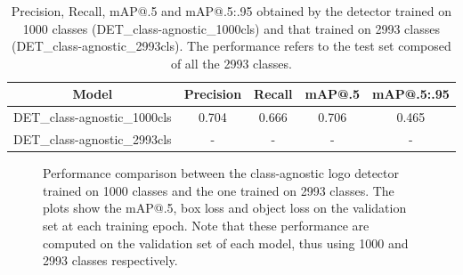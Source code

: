 \begin{table}[H]
    \centering
    \begin{tabular}{c|c|c|c|c}
        \hline
        \textbf{Model} &
        \textbf{Precision} &
        \textbf{Recall} &
        \textbf{mAP@.5} &
        \textbf{mAP@.5:.95} \\
        \hline
        \hline
DET\_class-agnostic\_1000cls&0.704&0.666&0.706&0.465\\
DET\_class-agnostic\_2993cls&-&-&-&-\\
\hline
\end{tabular}
\caption{Precision, Recall, mAP@.5 and mAP@.5:.95 obtained by the detector trained on 1000 classes (DET\_class-agnostic\_1000cls) and that trained on 2993 classes (DET\_class-agnostic\_2993cls). The performance refers to the test set composed of all the 2993 classes.}
    \label{table:exp-det_2993}
\end{table}
\newpage

\begin{figure}[H]
	\centering
    \qquad
    \qquad
    \caption{Performance comparison between the class-agnostic logo detector trained on 1000 classes and the one trained on 2993 classes. The plots show the mAP@.5, box loss and object loss on the validation set at each training epoch. Note that these performance are computed on the validation set of each model, thus using 1000 and 2993 classes respectively.}%
	\label{fig:exp-det_2993}
\end{figure}


